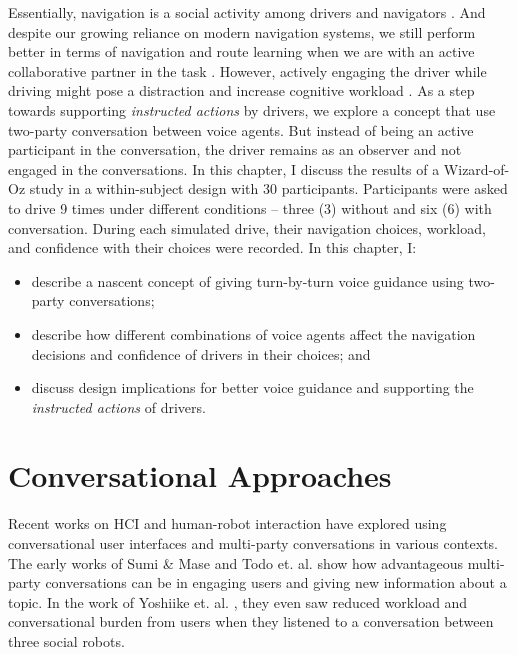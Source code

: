 Essentially, navigation is a social activity among drivers and navigators \cite{Forlizzi2010WhereTurn, Matsumura2014WhatDriving}. And despite our growing reliance on modern navigation systems, we still perform better in terms of navigation and route learning when we are with an active collaborative partner in the task \cite{Antrobus2017Driver-PassengerSystems, antrobus_large_burnett_hare_2019, Brown2012TheGPS}. However, actively engaging the driver while driving might pose a distraction and increase cognitive workload \cite{Karatas2018}. As a step towards supporting \textit{instructed actions} by drivers, we explore a concept that use two-party conversation between voice agents. But instead of being an active participant in the conversation, the driver remains as an observer and not engaged in the conversations. In this chapter, I discuss the results of a Wizard-of-Oz study in a within-subject design with 30 participants. Participants were asked to drive 9 times under different conditions -- three (3) without and six (6) with conversation. During each simulated drive, their navigation choices, workload, and confidence with their choices were recorded. In this chapter, I:
\begin{itemize}
    \item describe a nascent concept of giving turn-by-turn voice guidance using two-party conversations;
    \item describe how different combinations of voice agents affect the navigation decisions and confidence of drivers in their choices; and
    \item discuss design implications for better voice guidance and supporting the \textit{instructed actions} of drivers.
\end{itemize}

\section{Conversational Approaches}
Recent works on HCI and human-robot interaction have explored using conversational user interfaces and multi-party conversations in various contexts. The early works of Sumi \& Mase \cite{Sumi:2001:AFF:375735.376344} and Todo et. al. \cite{Todo2013} show how advantageous multi-party conversations can be in engaging users and giving new information about a topic. In the work of Yoshiike et. al. \cite{Yoshiike:2011:MSI:2177868.2177871}, they even saw reduced workload and conversational burden from users when they listened to a conversation between three social robots. 

